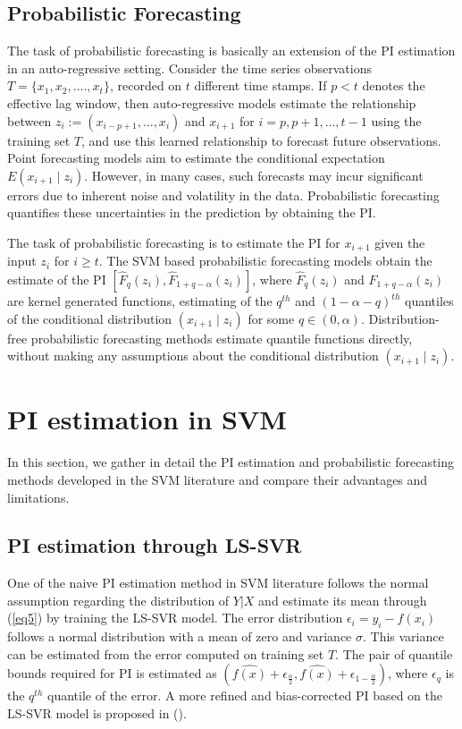 \documentclass[10pt]{article} %
\begin{document}
\subsection{Probabilistic Forecasting} 
The task of probabilistic forecasting is basically an extension of the PI estimation in an auto-regressive setting. Consider the time series observations $  T = \{ x_1,x_2,....,x_t \}$, recorded on $t$ different time stamps.  If \( p < t \) denotes the effective lag window, then auto-regressive models estimate the relationship between \( z_i := (x_{i-p+1}, \ldots, x_i) \) and \( x_{i+1} \) for \( i = p, p+1, \ldots, t-1 \) using the training set \( T \), and use this learned relationship to forecast future observations. Point forecasting models aim to estimate the conditional expectation $E(x_{i+1} \mid z_i)$. However, in many cases, such forecasts may incur significant errors due to inherent noise and volatility in the data. Probabilistic forecasting quantifies these uncertainties in the prediction by obtaining the PI. 

 The task of probabilistic forecasting is to estimate the PI for $x_{i+1}$ given the input $z_{i}$ for $i \geq  t$. The SVM based probabilistic forecasting models obtain the estimate of  the PI $[\hat{F}_{q}(z_{i}),\hat{F}_{1+q-\alpha}(z_{i})]$, where $\hat{F}_{q}(z_{i})$ and $\hat{F}_{1+q-\alpha}(z_{i})$ are  kernel generated functions, estimating of the  $q^{th}$ and ${(1-\alpha-q)}^{th}$ quantiles of the  conditional distribution $(x_{i+1} \mid z_{i})$ for some $ q \in (0,\alpha)$. Distribution-free probabilistic forecasting methods estimate quantile functions directly, without making any assumptions about the conditional distribution $(x_{i+1} \mid z_{i})$.




\section{PI estimation in SVM}
In this section, we gather in detail the PI estimation and probabilistic forecasting methods developed in the SVM literature and compare their advantages and limitations. 

\subsection{PI estimation through LS-SVR}
One of the naive PI estimation method in SVM literature follows the normal assumption regarding the distribution of $Y|X$ and estimate its mean through (\ref{eq5}) by training the LS-SVR model. The error distribution \(\epsilon_i = y_i - f(x_i)\) follows a normal distribution with a mean of zero and variance \(\sigma\). This variance can be estimated from the error computed on training set $T$. The pair of quantile bounds required for PI is estimated as $(\hat{f(x)}+\epsilon_{\frac{\alpha}{2}}, \hat{f(x)}+\epsilon_{1-\frac{\alpha}{2}}) $, where $\epsilon_q$ is the $q^{th}$ quantile of the error.
A more refined and bias-corrected PI based on the LS-SVR model is proposed in (\cite{de2010approximate,cheng2014confidence}).
\end{document}
